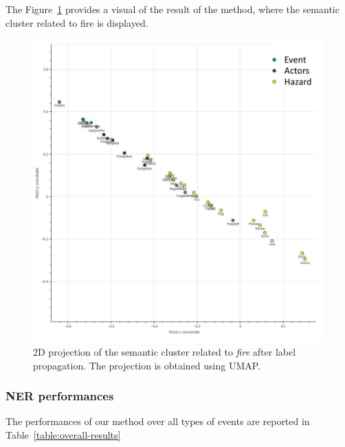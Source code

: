 The Figure~\ref{processing:fire-example} provides a visual of the result of the method, where the semantic cluster related to fire is displayed.

\begin{figure}[htb]
    \centering
    \includegraphics[width=\textwidth]{figures/chap-4/fire-example.pdf}
    \caption{2D projection of the semantic cluster related to \textit{fire} after label propagation. The projection is obtained using UMAP.}
    \label{processing:fire-example}
\end{figure}


\subsubsection{NER performances}
The performances of our method over all types of events are reported in Table~\ref{table:overall-results}

